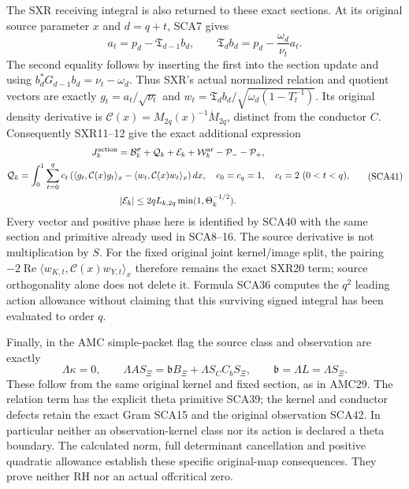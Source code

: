 The SXR receiving integral is also returned to these exact sections.
At its original source parameter $x$ and $d=q+t$, SCA7 gives
\[
 a_t=p_d-\mathfrak T_{d-1}b_d,\qquad
 \mathfrak T_db_d=p_d-\frac{\omega_d}{\nu_t}a_t.
 \tag{SCA40}
\]
The second equality follows by inserting the first into the section update
and using $b_d^*G_{d-1}b_d=\nu_t-\omega_d$. Thus SXR's actual normalized
relation and quotient vectors are exactly
$g_t=a_t/\sqrt{\nu_t}$ and
$w_t=\mathfrak T_db_d/\sqrt{\omega_d(1-T_t^{-1})}$.
Its original density derivative is
$\mathcal C(x)=M_{2q}(x)^{-1}\dot M_{2q}$, distinct from the conductor $C$.
Consequently SXR11--12 give the exact additional expression
\[
 \begin{gathered}
 J_k^{\rm action}=\mathcal B_k^\sigma+\mathcal Q_k+\mathcal E_k
                  +\mathcal W_k^{\rm ar}-\mathcal P_--\mathcal P_+,\\
 \mathcal Q_k=\int_0^1\sum_{t=0}^q c_t
   \left(\langle g_t,\mathcal C(x)g_t\rangle_x
              -\langle w_t,\mathcal C(x)w_t\rangle_x\right)dx,
 \quad c_0=c_q=1,\quad c_t=2\ (0<t<q),\\
 |\mathcal E_k|\le2qL_{k,2q}\min(1,\Theta_k^{-1/2}).
 \end{gathered}\tag{SCA41}
\]
Every vector and positive phase here is identified by SCA40 with the same
section and primitive already used in SCA8--16. The source derivative is
not multiplication by $S$. For the fixed original joint kernel/image split,
the pairing $-2\operatorname{Re}\langle w_{K,t},\mathcal C(x)w_{Y,t}\rangle_x$
therefore remains the exact SXR20 term; source orthogonality alone does not
delete it. Formula SCA36 computes the $q^2$ leading action allowance without
claiming that this surviving signed integral has been evaluated to order $q$.

Finally, in the AMC simple-packet flag the source class and observation are
exactly
\[
 \Lambda\kappa=0,\qquad
 \Lambda AS_\Xi=\mathfrak b B_\Xi+\Lambda S_C C_bS_\Xi,
 \qquad \mathfrak b=\Lambda L=\Lambda S_\Xi.
 \tag{SCA42}
\]
These follow from the same original kernel and fixed section, as in AMC29.
The relation term has the explicit theta primitive SCA39; the kernel and
conductor defects retain the exact Gram SCA15 and the original observation
SCA42. In particular neither an observation-kernel class nor its action is
declared a theta boundary. The calculated norm, full determinant cancellation
and positive quadratic allowance establish these specific original-map
consequences. They prove neither RH nor an actual offcritical zero.

